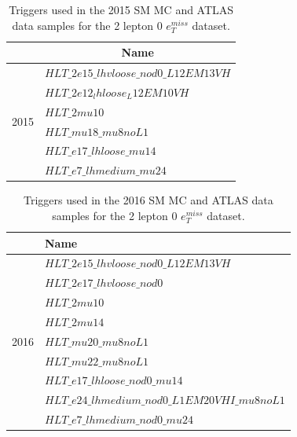 \begin{table}[H]
    \centering
    
    \begin{tabular}{|l|l|}
    \hline
                          & \multicolumn{1}{c|}{Name}              \\ \hline
    \multirow{6}{*}{2015} & $HLT\_2e15\_lhvloose\_nod0\_L12EM13VH$ \\ \cline{2-2} 
                          & $HLT\_2e12_lhloose_L12EM10VH$          \\ \cline{2-2} 
                          & $HLT\_2mu10$                           \\ \cline{2-2} 
                          & $HLT\_mu18\_mu8noL1$                   \\ \cline{2-2} 
                          & $HLT\_e17\_lhloose\_mu14$              \\ \cline{2-2} 
                          & $HLT\_e7\_lhmedium\_mu24$              \\ \hline
    \end{tabular}
    \caption[2015 triggers table]{Triggers used in the 2015 SM MC and ATLAS data samples for the 2 lepton 0 $e_T^{miss}$ dataset.}
    \label{tab:triggers2015}
    \end{table}



\begin{table}[H]
    \centering
    
    \begin{tabular}{|l|l|}
    \hline
                          & Name  \\ \hline
    \multirow{9}{*}{2016} & $HLT\_2e15\_lhvloose\_nod0\_L12EM13VH$                 \\ \cline{2-2} 
                          & $HLT\_2e17\_lhvloose\_nod0$                   \\ \cline{2-2} 
                          & $HLT\_2mu10$                  \\ \cline{2-2} 
                          & $HLT\_2mu14$                  \\ \cline{2-2} 
                          & $HLT\_mu20\_mu8noL1$                  \\ \cline{2-2} 
                          & $HLT\_mu22\_mu8noL1$                 \\ \cline{2-2} 
                          & $HLT\_e17\_lhloose\_nod0\_mu14$                   \\ \cline{2-2} 
                          & $HLT\_e24\_lhmedium\_nod0\_L1EM20VHI\_mu8noL1$                  \\ \cline{2-2} 
                          & $HLT\_e7\_lhmedium\_nod0\_mu24$                   \\ \hline
    \end{tabular}
    \caption[2016 triggers table]{Triggers used in the 2016 SM MC and ATLAS data samples for the 2 lepton 0 $e_T^{miss}$ dataset.}
    \label{tab:triggers2016}
    \end{table}




